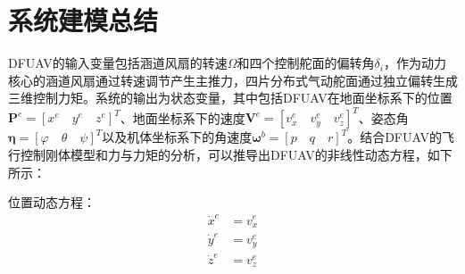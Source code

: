 \section{系统建模总结}

DFUAV的输入变量包括涵道风扇的转速$\Omega$和四个控制舵面的偏转角$\delta_i$，作为动力核心的涵道风扇通过转速调节产生主推力，四片分布式气动舵面通过独立偏转生成三维控制力矩。系统的输出为状态变量，其中包括DFUAV在地面坐标系下的位置$\boldsymbol{P}^{e}=[{x}^{e} \quad {y}^{e} \quad {z}^{e}]^{T}$、地面坐标系下的速度$\boldsymbol{V}^{e}=[{v}^{e}_{x} \quad {v}^{e}_{y} \quad {v}^{e}_{z}]^{T}$、姿态角$\boldsymbol{\eta}=[\varphi \quad \theta \quad \psi]^T$以及机体坐标系下的角速度$\boldsymbol{\omega}^b=[p \quad q \quad r]^T$。结合DFUAV的飞行控制刚体模型和力与力矩的分析，可以推导出DFUAV的非线性动态方程，如下所示：

位置动态方程：
\begin{equation}
    \begin{aligned}
        \dot{x}^{e}&=v_x^e\\
        \dot{y}^{e}&=v_y^e\\
        \dot{z}^{e}&=v_z^e
    \end{aligned}
    \label{eq_40}
\end{equation}

